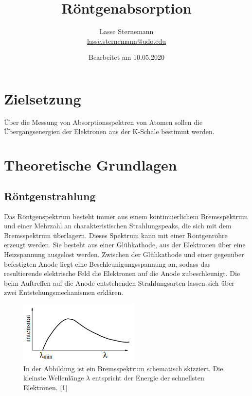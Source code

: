 \documentclass[titlepage = firstcover]{scrartcl}
\title{Röntgenabsorption}
\author{
  Lasse Sternemann\\
  \href{mailto:lasse.sternemann@udo.edu}{lasse.sternemann@udo.edu}
}
\date{Bearbeitet am 10.05.2020}
\begin{document}
    \maketitle
    \newpage
    \tableofcontents
    \newpage

    \section{Zielsetzung}
        Über die Messung von Absorptionsspektren von Atomen sollen die Übergangsenergien der Elektronen aus der K-Schale bestimmt werden.



    \section{Theoretische Grundlagen}
        \subsection{Röntgenstrahlung}
            Das Röntgenspektrum besteht immer aus einem kontinuierlichem Bremsspektrum und einer Mehrzahl an charakteristischen Strahlungspeaks, die sich mit dem Bremsspektrum überlagern.
            Dieses Spektrum kann mit einer Röntgenröhre erzeugt werden. Sie besteht aus einer Glühkathode, aus der Elektronen über eine Heizspannung ausgelöst werden. Zwischen der Glühkathode und einer
            gegenüber befestigten Anode liegt eine Beschleunigungsspannung an, sodass das resultierende elektrische Feld die Elektronen auf die Anode zubeschleunigt. Die beim Auftreffen auf die Anode 
            entstehenden Strahlungsarten lassen sich über zwei Entstehungsmechanismen erklären.

            \FloatBarrier

            \begin{figure}[h]
              \centering
              \includegraphics{Brems.png}
              \caption{In der Abbildung ist ein Bremsspektrum schematisch skizziert. Die kleinste Wellenlänge $\lambda$ entspricht der Energie der schnellsten Elektronen. [1]}
              \label{fig:SkizzeBrems}
            \end{figure}
\end{document}
